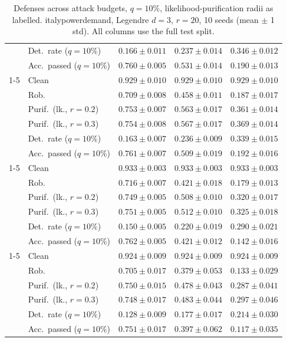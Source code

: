 \begin{table}[htbp]
\begin{tabular}{@{}llrrr@{}}
     & Det.\ rate ($q{=}10\%$) & $\mathbf{0.166 \pm 0.011}$ & $\mathbf{0.237 \pm 0.014}$ & $\mathbf{0.346 \pm 0.012}$ \\
     & Acc.\ passed ($q{=}10\%$) & $0.760 \pm 0.005$ & $0.531 \pm 0.014$ & $0.190 \pm 0.013$ \\
    \cmidrule(lr){1-5}
    \multirow{6}{*}{$\alpha{=}0.2$} & Clean & $0.929 \pm 0.010$ & $0.929 \pm 0.010$ & $0.929 \pm 0.010$ \\
     & Rob. & $0.709 \pm 0.008$ & $0.458 \pm 0.011$ & $0.187 \pm 0.017$ \\
     & Purif.\ (lk., $r{=}0.2$) & $0.753 \pm 0.007$ & $0.563 \pm 0.017$ & $0.361 \pm 0.014$ \\
     & Purif.\ (lk., $r{=}0.3$) & $0.754 \pm 0.008$ & $0.567 \pm 0.017$ & $0.369 \pm 0.014$ \\
     & Det.\ rate ($q{=}10\%$) & $0.163 \pm 0.007$ & $0.236 \pm 0.009$ & $0.339 \pm 0.015$ \\
     & Acc.\ passed ($q{=}10\%$) & $0.761 \pm 0.007$ & $0.509 \pm 0.019$ & $0.192 \pm 0.016$ \\
    \cmidrule(lr){1-5}
    \multirow{6}{*}{$\alpha{=}0.5$} & Clean & $0.933 \pm 0.003$ & $0.933 \pm 0.003$ & $0.933 \pm 0.003$ \\
     & Rob. & $0.716 \pm 0.007$ & $0.421 \pm 0.018$ & $0.179 \pm 0.013$ \\
     & Purif.\ (lk., $r{=}0.2$) & $0.749 \pm 0.005$ & $0.508 \pm 0.010$ & $0.320 \pm 0.017$ \\
     & Purif.\ (lk., $r{=}0.3$) & $0.751 \pm 0.005$ & $0.512 \pm 0.010$ & $0.325 \pm 0.018$ \\
     & Det.\ rate ($q{=}10\%$) & $0.150 \pm 0.005$ & $0.220 \pm 0.019$ & $0.290 \pm 0.021$ \\
     & Acc.\ passed ($q{=}10\%$) & $0.762 \pm 0.005$ & $0.421 \pm 0.012$ & $0.142 \pm 0.016$ \\
    \cmidrule(lr){1-5}
    \multirow{6}{*}{$\alpha{=}1$} & Clean & $0.924 \pm 0.009$ & $0.924 \pm 0.009$ & $0.924 \pm 0.009$ \\
     & Rob. & $0.705 \pm 0.017$ & $0.379 \pm 0.053$ & $0.133 \pm 0.029$ \\
     & Purif.\ (lk., $r{=}0.2$) & $0.750 \pm 0.015$ & $0.478 \pm 0.043$ & $0.287 \pm 0.041$ \\
     & Purif.\ (lk., $r{=}0.3$) & $0.748 \pm 0.017$ & $0.483 \pm 0.044$ & $0.297 \pm 0.046$ \\
     & Det.\ rate ($q{=}10\%$) & $0.128 \pm 0.009$ & $0.177 \pm 0.017$ & $0.214 \pm 0.030$ \\
     & Acc.\ passed ($q{=}10\%$) & $0.751 \pm 0.017$ & $0.397 \pm 0.062$ & $0.117 \pm 0.035$ \\
    \bottomrule
  \end{tabular}
  \caption{Defenses across attack budgets, $q{=}10\%$, likelihood-purification radii as labelled. italypowerdemand, Legendre $d{=}3$, $r{=}20$, 10 seeds (mean $\pm$ 1 std). All columns use the full test split.}
  \label{tab:italypowerdemand_models_r20}
\end{table}
